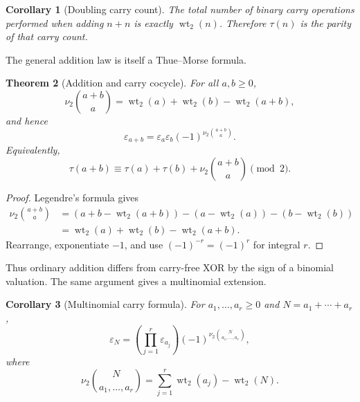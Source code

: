 \documentclass[11pt,oneside]{article}
\newtheorem{theorem}{Theorem}[section]
\newtheorem{corollary}[theorem]{Corollary}
\theoremstyle{definition}
\theoremstyle{remark}
\newcommand{\wt}{\operatorname{wt}_2}
\newcommand{\vtwo}{\nu_2}
\begin{document}
\begin{corollary}[Doubling carry count]
\label{cor:doubling-carries}
The total number of binary carry operations performed when adding $n+n$ is
exactly $\wt(n)$.  Therefore $\tau(n)$ is the parity of that carry count.
\end{corollary}

The general addition law is itself a Thue--Morse formula.

\begin{theorem}[Addition and carry cocycle]
\label{thm:addition-carry}
For all $a,b\ge0$,
\begin{equation}
  \vtwo\binom{a+b}{a}
  =\wt(a)+\wt(b)-\wt(a+b),                                 \label{eq:kummer-digit-sum}
\end{equation}
and hence
\begin{equation}
  \boxed{\displaystyle
  \varepsilon_{a+b}
   =\varepsilon_a\varepsilon_b
      (-1)^{\vtwo\binom{a+b}{a}}.}                         \label{eq:addition-cocycle}
\end{equation}
Equivalently,
\begin{equation}
  \tau(a+b)\equiv\tau(a)+\tau(b)+
  \vtwo\binom{a+b}{a}\pmod2.                              \label{eq:addition-bit}
\end{equation}
\end{theorem}

\begin{proof}
Legendre's formula gives
\begin{align*}
 \vtwo\binom{a+b}{a}
 &=(a+b-\wt(a+b))-(a-\wt(a))-(b-\wt(b))\\
 &=\wt(a)+\wt(b)-\wt(a+b).
\end{align*}
Rearrange, exponentiate $-1$, and use
$(-1)^{-r}=(-1)^r$ for integral $r$.
\end{proof}

Thus ordinary addition differs from carry-free XOR by the sign of a binomial
valuation.  The same argument gives a multinomial extension.

\begin{corollary}[Multinomial carry formula]
\label{cor:multinomial-carry}
For $a_1,\ldots,a_r\ge0$ and $N=a_1+\cdots+a_r$,
\begin{equation}
  \varepsilon_N
  =\left(\prod_{j=1}^{r}\varepsilon_{a_j}\right)
   (-1)^{\vtwo\binom{N}{a_1,\ldots,a_r}},                  \label{eq:multinomial-sign}
\end{equation}
where
\begin{equation}
 \vtwo\binom{N}{a_1,\ldots,a_r}
 =\sum_{j=1}^{r}\wt(a_j)-\wt(N).                           \label{eq:multinomial-v2}
\end{equation}
\end{corollary}
\end{document}
